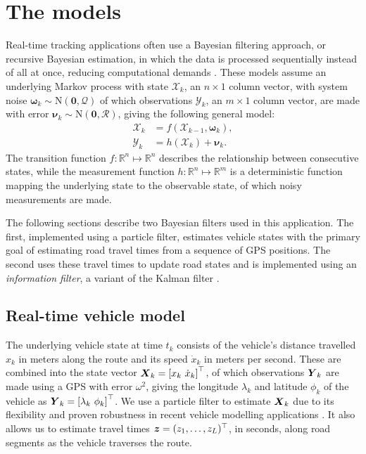 \section{The models}
\label{sec:models}

Real-time tracking applications often use
a Bayesian filtering approach,
or recursive Bayesian estimation,
in which the data is processed sequentially instead of all at once,
reducing computational demands
\citep{Anderson_2012}.
These models assume an underlying Markov process with state $\boldsymbol{\mathcal{X}}_k$,
an $n\times1$ column vector,
with system noise $\boldsymbol{\omega}_k\sim\mathrm{N}(\boldsymbol{0},\mathcal{Q})$
of which observations $\boldsymbol{\mathcal{Y}}_k$,
an $m\times1$ column vector, are made
with error $\boldsymbol{\nu}_k\sim\mathrm{N}(\boldsymbol{0},\mathcal{R})$,
giving the following general model:
\begin{equation}
\label{eq:rbe_model}
\begin{split}
\boldsymbol{\mathcal{X}}_k &= f(\boldsymbol{\mathcal{X}}_{k-1}, \boldsymbol{\omega}_k), \\
\boldsymbol{\mathcal{Y}}_k &= h(\boldsymbol{\mathcal{X}}_k) + \boldsymbol{\nu}_k.
\end{split}
\end{equation}
The transition function $f:\mathbb{R}^n\mapsto\mathbb{R}^n$
describes the relationship between consecutive states,
while the measurement function $h:\mathbb{R}^n\mapsto\mathbb{R}^m$ is a deterministic function
mapping the underlying state to the observable state,
of which noisy measurements are made.



The following sections describe two Bayesian filters used in this application.
The first, implemented using a particle filter, estimates vehicle states
with the primary goal of estimating road travel times from a sequence of GPS positions.
The second uses these travel times to update road states
and is implemented using an \emph{information filter},
a variant of the Kalman filter \citep{Anderson_2012}.



\subsection{Real-time vehicle model}
\label{sec:pf}

The underlying vehicle state at time $t_k$ consists of
the vehicle's distance travelled $x_k$ in meters along the route and
its speed $\dot x_k$ in meters per second.
These are combined into the state vector
$\mbox{$\boldsymbol{X}$}_k = \left[x_k\ \dot x_k\right]^\top$,
of which observations $\mbox{$\boldsymbol{Y}$}_k$ are made using a GPS
with error $\omega^2$,
giving the longitude $\lambda_k$ and latitude $\phi_k$ of the vehicle
as $\bY_k = \left[\lambda_k\ \phi_k \right]^\top$.
We use a particle filter to estimate $\mbox{$\boldsymbol{X}$}_k$
due to its flexibility and proven robustness
in recent vehicle modelling applications \citep{Ulmke_2006,Hans_2015}.
It also allows us to estimate travel times
$\boldsymbol{z} = (z_1,\ldots,z_L)^\top$, in seconds, along road segments
as the vehicle traverses the route.



